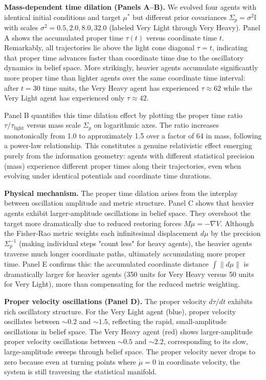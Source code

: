 \documentclass[11pt]{article}
\begin{document}
\textbf{Mass-dependent time dilation (Panels A--B).} We evolved four agents with identical initial conditions and target $\mu^*$ but different prior covariances $\Sigma_p = \sigma^2 \mathbb{I}$ with scales $\sigma^2 = 0.5, 2.0, 8.0, 32.0$ (labeled Very Light through Very Heavy). Panel A shows the accumulated proper time $\tau(t)$ versus coordinate time $t$. Remarkably, all trajectories lie above the light cone diagonal $\tau = t$, indicating that proper time advances faster than coordinate time due to the oscillatory dynamics in belief space. More strikingly, heavier agents accumulate significantly more proper time than lighter agents over the same coordinate time interval: after $t=30$ time units, the Very Heavy agent has experienced $\tau \approx 62$ while the Very Light agent has experienced only $\tau \approx 42$.

Panel B quantifies this time dilation effect by plotting the proper time ratio $\tau/\tau_{\text{light}}$ versus mass scale $\Sigma_p$ on logarithmic axes. The ratio increases monotonically from 1.0 to approximately 1.5 over a factor of 64 in mass, following a power-law relationship. This constitutes a genuine relativistic effect emerging purely from the information geometry: agents with different statistical precision (mass) experience different proper times along their trajectories, even when evolving under identical potentials and coordinate time durations.

\textbf{Physical mechanism.} The proper time dilation arises from the interplay between oscillation amplitude and metric structure. Panel C shows that heavier agents exhibit larger-amplitude oscillations in belief space. They overshoot the target more dramatically due to reduced restoring forces $M\ddot{\mu} = -\nabla V$. Although the Fisher-Rao metric weights each infinitesimal displacement $d\mu$ by the precision $\Sigma_p^{-1}$ (making individual steps "count less" for heavy agents), the heavier agents traverse much longer coordinate paths, ultimately accumulating more proper time. Panel E confirms this: the accumulated coordinate distance $\int \|d\mu\|$ is dramatically larger for heavier agents (350 units for Very Heavy versus 50 units for Very Light), more than compensating for the reduced metric weighting.

\textbf{Proper velocity oscillations (Panel D).} The proper velocity $d\tau/dt$ exhibits rich oscillatory structure. For the Very Light agent (blue), proper velocity oscillates between $\sim 0.2$ and $\sim 1.5$, reflecting the rapid, small-amplitude oscillations in belief space. The Very Heavy agent (red) shows larger-amplitude proper velocity oscillations between $\sim 0.5$ and $\sim 2.2$, corresponding to its slow, large-amplitude sweeps through belief space. The proper velocity never drops to zero because even at turning points where $\dot{\mu} = 0$ in coordinate velocity, the system is still traversing the statistical manifold.
\end{document}
